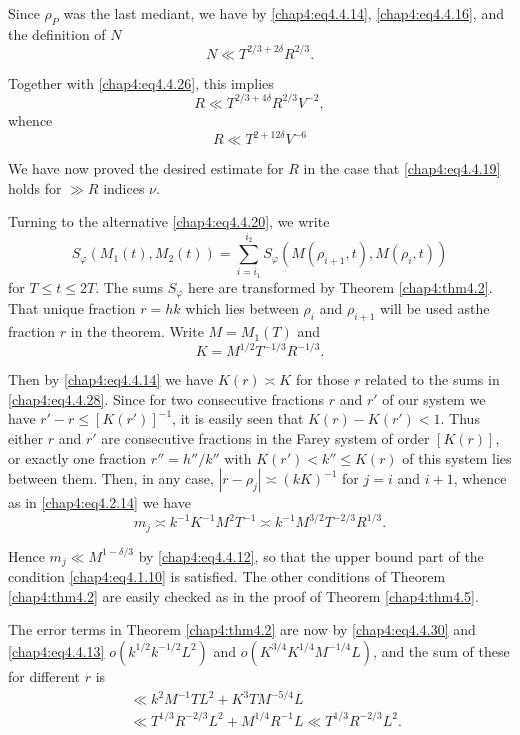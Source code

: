 Since $\rho_P$ was the last mediant, we have by \eqref{chap4:eq4.4.14}, \eqref{chap4:eq4.4.16}, and the definition of $N$
$$
N\ll T^{2/3+2\delta}R^{2/3}.
$$

Together with \eqref{chap4:eq4.4.26}, this implies
$$
R\ll T^{2/3+4\delta}R^{2/3}V^{-2},
$$
whence
\begin{equation}\label{chap4:eq4.4.27}
R\ll T^{2+12\delta}V^{-6}
\end{equation}

We have now proved the desired estimate for $R$ in the case that \eqref{chap4:eq4.4.19} holds for $\gg R$ indices $\nu$.

Turning to the alternative \eqref{chap4:eq4.4.20}, we write
\begin{equation}\label{chap4:eq4.4.28}
S_\varphi\left(M_1(t),M_2(t)\right)=\sum\limits_{i=i_1}^{i_2}S_\varphi\left(M\left( \rho_{i+1},t\right),M\left(\rho_i,t\right)\right)
\end{equation}
for $T\leq t\leq 2T$. The sums $S_\varphi$ here are transformed by Theorem \ref{chap4:thm4.2}. That unique fraction $r=hk$ which lies between $\rho_i$ and $\rho_{i+1}$ will be used as\pageoriginale the fraction $r$ in the theorem. Write $M=M_1(T)$ and 
\begin{equation}\label{chap4:eq4.4.29}
K=M^{1/2}T^{-1/3}R^{-1/3}.
\end{equation}

Then by \eqref{chap4:eq4.4.14} we have $K(r)\asymp K$ for those $r$ related to the sums in \eqref{chap4:eq4.4.28}. Since for two consecutive fractions $r$ and $r'$ of our system we have $r'-r\leq[K(r')]^{-1}$, it is easily seen that $K(r)-K(r')<1$. Thus either $r$ and $r'$ are consecutive fractions in the Farey system of order $[K(r)]$, or exactly one fraction $r''=h''/k''$ with $K(r')<k''\leq K(r)$ of this system lies between them. Then, in any case, $|r-\rho_j|\asymp (kK)^{-1}$ for $j=i$ and $i+1$, whence as in \eqref{chap4:eq4.2.14} we have 
\begin{equation}\label{chap4:eq4.4.30}
m_j\asymp k^{-1}K^{-1}M^2T^{-1}\asymp k^{-1}M^{3/2}T^{-2/3}R^{1/3}.
\end{equation}

Hence $m_j\ll M^{1-\delta/3}$ by \eqref{chap4:eq4.4.12}, so that the upper bound part of the condition \eqref{chap4:eq4.1.10} is satisfied. The other conditions of Theorem \ref{chap4:thm4.2} are easily checked as in the proof of Theorem \ref{chap4:thm4.5}.

The error terms in Theorem \ref{chap4:thm4.2} are now by
\eqref{chap4:eq4.4.30} and \eqref{chap4:eq4.4.13}
$o(k^{1/2}k^{-1/2}L^2)$ and $o(K^{3/4}K^{1/4}M^{-1/4}L)$, and the sum
of these for different $r$ is  
\begin{align*}
& \ll k^2M^{-1}TL^2+K^3TM^{-5/4}L\\
& \ll T^{1/3}R^{-2/3}L^2+M^{1/4}R^{-1}L\ll T^{1/3}R^{-2/3}L^2.
\end{align*}

